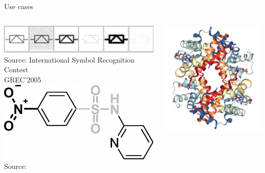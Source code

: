\documentclass{beamer}
\begin{document}
\begin{frame}{Use cases}
  \begin{columns}[t]
    \begin{column}{0.5\textwidth}
      \centering
      \includegraphics[width=\textwidth]{grec.jpg} \\
      {\tiny\color{gray}Source: International Symbol Recognition Contest\\[-7pt] GREC'2005} \\
      \vspace{1.15cm}
      \includegraphics[width=\textwidth]{muta.png} \\
      {\tiny\color{gray}Source: \cite{doi:10.1021/jm040835a}}
    \end{column}
    \begin{column}{0.5\textwidth}
      \centering
      \includegraphics[height=0.3\textheight]{protein.jpg} \\

\end{column}
\end{columns}
\end{frame}
\end{document}
